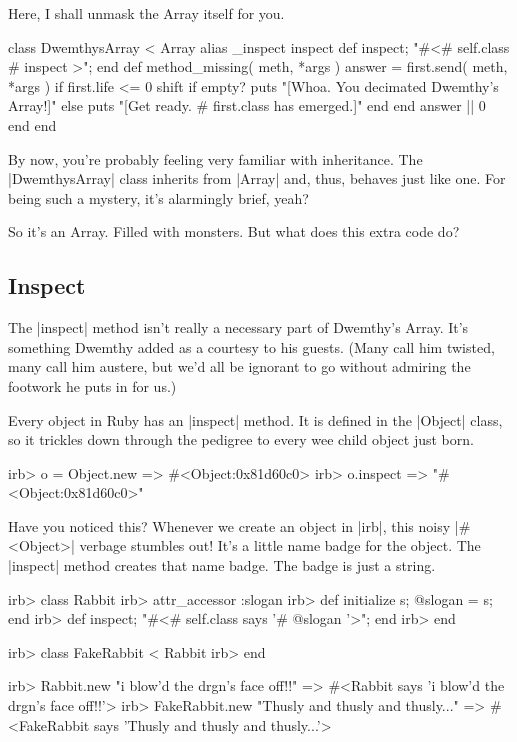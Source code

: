 \documentclass[12pt,twoside]{report}
\begin{document}
Here, I shall unmask the Array itself for you.


\begin{rubycode}

 class DwemthysArray < Array
   alias _inspect inspect
   def inspect; "#<#{ self.class }#{ inspect }>"; end
   def method_missing( meth, *args )
     answer = first.send( meth, *args )
     if first.life <= 0
       shift
       if empty?
         puts "[Whoa.  You decimated Dwemthy's Array!]"
       else
         puts "[Get ready. #{ first.class } has emerged.]"
       end
     end
     answer || 0
   end
 end

\end{rubycode}


By now, you're probably feeling very familiar with inheritance.  The
\rubyinline|DwemthysArray| class inherits from
\rubyinline|Array| and, thus, behaves just like one.
For being such a mystery, it's alarmingly brief, yeah?

So it's an Array.  Filled with monsters.  But what does this extra
code do?



\subsection{Inspect}



The \rubyinline|inspect| method isn't really a
necessary part of Dwemthy's Array.  It's something Dwemthy added as a
courtesy to his guests.  (Many call him twisted, many call him
austere, but we'd all be ignorant to go without admiring the footwork
he puts in for us.)

Every object in Ruby has an \rubyinline|inspect|
method.  It is defined in the \rubyinline|Object|
class, so it trickles down through the pedigree to every wee child
object just born.


\begin{consolecode}

 irb> o = Object.new
   => #<Object:0x81d60c0>
 irb> o.inspect
   => "#<Object:0x81d60c0>"

\end{consolecode}


Have you noticed this?  Whenever we create an object in
\rubyinline|irb|, this noisy
\rubyinline|#<Object>| verbage stumbles out!  It's a
little name badge for the object.  The
\rubyinline|inspect| method creates that name badge.
The badge is just a string.


\begin{consolecode}

 irb> class Rabbit
 irb>   attr_accessor :slogan
 irb>   def initialize s; @slogan = s; end
 irb>   def inspect; "#<#{ self.class } says '#{ @slogan }'>"; end
 irb> end

 irb> class FakeRabbit < Rabbit
 irb> end

 irb> Rabbit.new "i blow'd the drgn's face off!!"
   => #<Rabbit says 'i blow'd the drgn's face off!!'>
 irb> FakeRabbit.new "Thusly and thusly and thusly..."
   => #<FakeRabbit says 'Thusly and thusly and thusly...'>

\end{consolecode}
\end{document}
